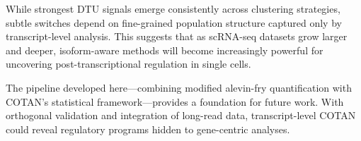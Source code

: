 While strongest DTU signals emerge consistently across clustering strategies, subtle switches depend on fine-grained population structure captured only by transcript-level analysis. This suggests that as scRNA-seq datasets grow larger and deeper, isoform-aware methods will become increasingly powerful for uncovering post-transcriptional regulation in single cells.

The pipeline developed here—combining modified alevin-fry quantification with COTAN's statistical framework—provides a foundation for future work. With orthogonal validation and integration of long-read data, transcript-level COTAN could reveal regulatory programs hidden to gene-centric analyses.
